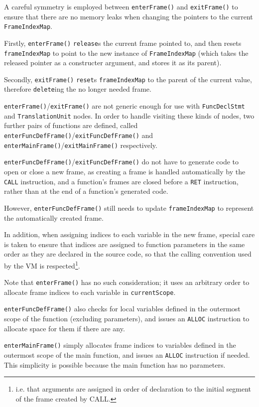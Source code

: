 \documentclass[11pt,a4paper]{scrartcl}
\begin{document}
\begin{itemize}
        A careful symmetry is employed between \verb|enterFrame()| and \verb|exitFrame()| to ensure that there are no memory leaks when changing the pointers to the current \verb|FrameIndexMap|.

        Firstly, \verb|enterFrame()| \verb|release|s the current frame pointed to, and then resets \verb|frameIndexMap| to point to the new instance of \verb|FrameIndexMap| (which takes the released pointer as a constructer argument, and stores it as its parent).

        Secondly, \verb|exitFrame()| \verb|reset|s \verb|frameIndexMap| to the parent of the current value, therefore \verb|delete|ing the no longer needed frame.

        \verb|enterFrame()|/\verb|exitFrame()| are not generic enough for use with \verb|FuncDeclStmt| and \verb|TranslationUnit| nodes. In order to handle visiting these kinds of nodes, two further pairs of functions are defined, called \verb|enterFuncDefFrame()|/\verb|exitFuncDefFrame()| and \verb|enterMainFrame()|/\verb|exitMainFrame()| respectively.

        \verb|enterFuncDefFrame()|/\verb|exitFuncDefFrame()| do not have to generate code to open or close a new frame, as creating a frame is handled automatically by the \verb|CALL| instruction, and a function's frames are closed before a \verb|RET| instruction, rather than at the end of a function's generated code.

        However, \verb|enterFuncDefFrame()| still needs to update \verb|frameIndexMap| to represent the automatically created frame.

        In addition, when assigning indices to each variable in the new frame, special care is taken to ensure that indices are assigned to function parameters in the same order as they are declared in the source code, so that the calling convention used by the VM is respected\footnote{i.e. that arguments are assigned in order of declaration to the initial segment of the frame created by CALL.}.

        Note that \verb|enterFrame()| has no such consideration; it uses an arbitrary order to allocate frame indices to each variable in \verb|currentScope|.

        \verb|enterFuncDefFrame()| also checks for local variables defined in the outermost scope of the function (excluding parameters), and issues an \verb|ALLOC| instruction to allocate space for them if there are any.

        \verb|enterMainFrame()| simply allocates frame indices to variables defined in the outermost scope of the main function, and issues an \verb|ALLOC| instruction if needed. This simplicity is possible because the main function has no parameters.


\end{itemize}
\end{document}
